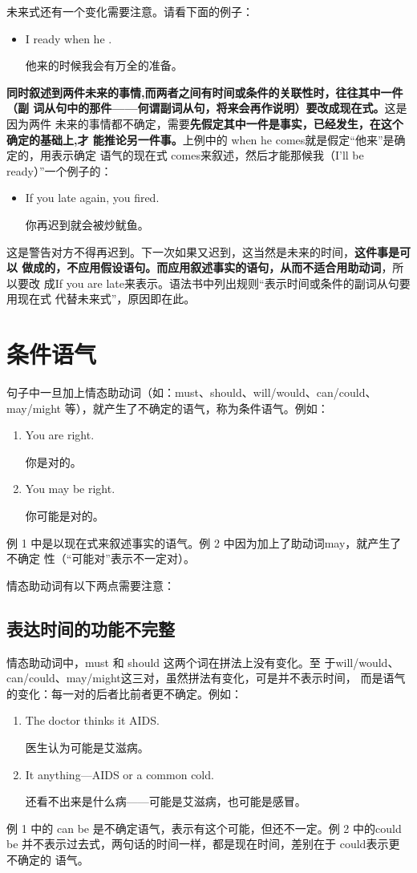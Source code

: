 未来式还有一个变化需要注意。请看下面的例子：
\begin{itemize}
\item  I ready when he .

  他来的时候我会有万全的准备。
\end{itemize}
\textbf{同时叙述到两件未来的事情,而两者之间有时间或条件的关联性时，往往其中一件（副
  词从句中的那件——何谓副词从句，将来会再作说明）要改成现在式。}这是因为两件
未来的事情都不确定，需要\textbf{先假定其中一件是事实，已经发生，在这个确定的基础上,才
  能推论另一件事。}上例中的 when he comes就是假定“他来”是确定的，用表示确定
语气的现在式 comes来叙述，然后才能那候我（I'll be ready）”一个例子的：
\begin{itemize}
\item  If you  late again, you fired.

  你再迟到就会被炒鱿鱼。
\end{itemize}
这是警告对方不得再迟到。下一次如果又迟到，这当然是未来的时间，\textbf{这件事是可以
  做成的，不应用假设语句。而应用叙述事实的语句，从而不适合用助动词}，所以要改
成If you are late来表示。语法书中列出规则“表示时间或条件的副词从句要用现在式
代替未来式”，原因即在此。

\section{条件语气}

句子中一旦加上情态助动词（如：must、should、will/would、can/could、may/might
等），就产生了不确定的语气，称为条件语气。例如：
\begin{enumerate}
\item  You are right.

  你是对的。
\item  You may be right.

  你可能是对的。
\end{enumerate}
例 1 中是以现在式来叙述事实的语气。例 2 中因为加上了助动词may，就产生了不确定
性（“可能对”表示不一定对）。

情态助动词有以下两点需要注意：

\subsection{表达时间的功能不完整}

情态助动词中，must 和 should 这两个词在拼法上没有变化。至
于will/would、can/could、may/might这三对，虽然拼法有变化，可是并不表示时间，
而是语气的变化：每一对的后者比前者更不确定。例如：
\begin{enumerate}
\item The doctor thinks it  AIDS.

  医生认为可能是艾滋病。
\item It  anything---AIDS or a common cold.

  还看不出来是什么病——可能是艾滋病，也可能是感冒。
\end{enumerate}
例 1 中的 can be 是不确定语气，表示有这个可能，但还不一定。例 2 中的could be
并不表示过去式，两句话的时间一样，都是现在时间，差别在于 could表示更不确定的
语气。

